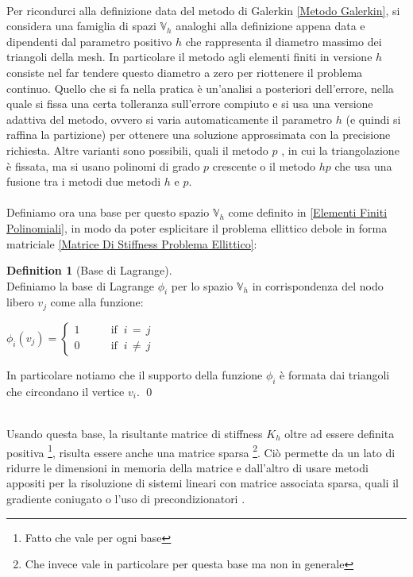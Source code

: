 \documentclass[12pt,a4paper]{report}
\theoremstyle{theorem}
\theoremstyle{theorem}
\theoremstyle{definition}
\newtheorem{definition}{Definition}[section]
\begin{document}
\hfill \\
Per ricondurci alla definizione data del metodo di Galerkin \ref{Metodo Galerkin}, si considera una famiglia di spazi $\mathbb{V}_{h}$ analoghi alla definizione appena data e dipendenti dal parametro positivo $h$ che rappresenta il diametro massimo dei triangoli della mesh. In particolare il  metodo agli elementi finiti in versione $h$ consiste nel far tendere questo diametro a zero per riottenere il problema continuo. Quello che si fa nella pratica è un'analisi a posteriori dell'errore, nella quale si fissa una certa tolleranza sull'errore compiuto e si usa una versione adattiva del metodo, ovvero si varia automaticamente il parametro $h$ (e quindi si raffina la partizione) per ottenere una soluzione approssimata con la precisione richiesta. Altre varianti sono possibili, quali il metodo $p$ \cite{babuvska1981p}, in cui la triangolazione è fissata, ma si usano polinomi di grado $p$ crescente o il metodo $hp$ \cite{babuvska1994hp} che usa una fusione tra i metodi due metodi $h$ e $p$.\\
\hfill \\
Definiamo ora una base per questo spazio $\mathbb{V}_{h}$ come definito in \ref{Elementi Finiti Polinomiali}, in modo da poter esplicitare il problema ellittico debole in forma matriciale \ref{Matrice Di Stiffness Problema Ellittico}:
\begin{definition} [Base di Lagrange]  \label{Base di Lagrange}
\hfill \\
Definiamo la base di Lagrange $\phi_{i}$ per lo spazio $\mathbb{V}_{h}$ in corrispondenza del nodo libero $v_{j}$ come alla funzione:
\begin{center}
\begin{math}
\phi_{i}(v_{j}) = \left\{ \begin{array}{ll}
         1 \qquad & \mbox{if $\ i \, = \, j$}\\
         0 \qquad & \mbox{if $\ i \, \neq \, j$}\end{array} \right.
\end{math}
\end{center}
In particolare notiamo che il supporto della funzione $\phi_{i}$ è formata dai triangoli che circondano il vertice $v_{i}$.
\qed
\end{definition}
\hfill \\
Usando questa base, la risultante matrice di stiffness $K_{h}$ oltre ad essere definita positiva \footnote{Fatto che vale per ogni base}, risulta essere anche una matrice sparsa \footnote{Che invece vale in particolare per questa base ma non in generale}. Ciò permette da un lato di ridurre le dimensioni in memoria della matrice e dall'altro di usare metodi appositi per la risoluzione di sistemi lineari con matrice associata sparsa, quali il gradiente coniugato o l'uso di precondizionatori \cite{SaadSparse}.\\
\end{document}
